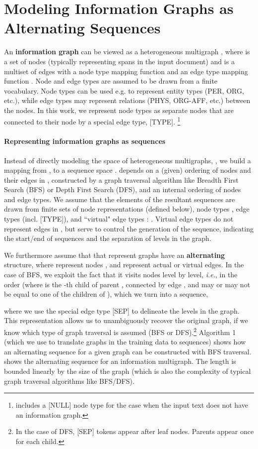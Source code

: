 \documentclass[11pt,a4paper]{article}
\begin{document}
\section{Modeling Information Graphs as Alternating Sequences}


An \textbf{information graph} can be viewed as a heterogeneous multigraph \cite{li-etal-2014-constructing,hgraph} , where  is a set of nodes (typically representing spans  in the input document) and  is a multiset of edges with a node type mapping function  and an edge type mapping function . Node and edge types are  assumed to be drawn from a finite vocabulary. Node types can be used e.g. to represent entity types (PER, ORG, etc.), while edge types may represent relations (PHYS, ORG-AFF, etc.) between the nodes.
In this work, we represent node types as separate nodes that are connected to their node  by a special edge type, [TYPE]. \footnote{ includes a [NULL] node type for the case when the input text does not have an information graph.}


\paragraph{Representing information graphs as sequences}
Instead of directly modeling the  space of heterogeneous multigraphs, , we  build a mapping   from  , to a sequence space .   depends on a (given) ordering  of nodes and their edges in , constructed by a graph traversal algorithm like Breadth First Search (BFS) or Depth First Search (DFS), and an internal ordering of nodes and edge types.
We assume that the elements  of the resultant sequences  are drawn from finite sets of node representations  (defined below), node types , edge types  (incl. [TYPE]), and  ``virtual" edge types : .  Virtual edge types   do not represent edges in , but serve to control the generation of the sequence, indicating the start/end of sequences and the separation of levels in the graph.


We furthermore assume that   that represent graphs have an \textbf{alternating} structure, where  represent nodes , and   represent actual or virtual edges.  In the case of BFS, we exploit the fact that it visits nodes level by level, \emph{i.e.}, in the order  (where  is the -th child of parent , connected by edge , and   may or may not be equal to one of the children of ), which we turn into a sequence,

where we use the special edge type [SEP] to delineate the levels in the graph. This representation allows us to unambiguously recover the original graph, if we know which type of graph traversal is assumed (BFS or DFS).\footnote{In the case of DFS, [SEP] tokens appear after leaf nodes. Parents appear once for each child.} 
Algorithm 1 (which we use to translate graphs in the training data to sequences) shows how an alternating sequence for a given graph can be constructed with BFS traversal.   shows the alternating sequence for an information multigraph. 
 The length  is bounded linearly by the size of the graph  (which is also the complexity of typical graph traversal algorithms like BFS/DFS).
\end{document}
